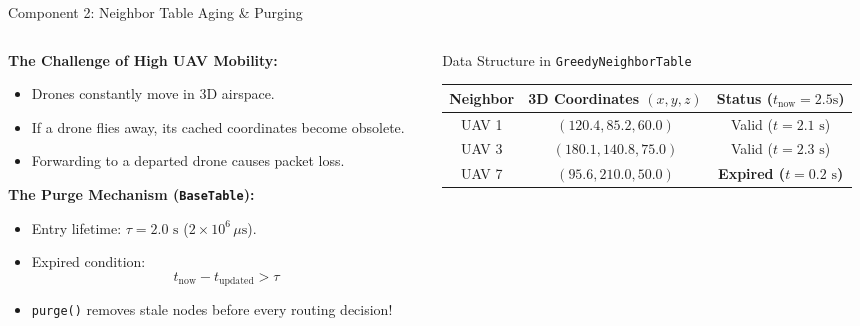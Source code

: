 \documentclass[aspectratio=169,10pt]{beamer}
\begin{document}
\begin{frame}{Component 2: Neighbor Table Aging \& Purging}
  \begin{columns}[T]
    \begin{column}{0.48\textwidth}
      \textbf{The Challenge of High UAV Mobility:}
      \begin{itemize}\setlength{\itemsep}{0.3em}
        \item Drones constantly move in 3D airspace.
        \item If a drone flies away, its cached coordinates become obsolete.
        \item Forwarding to a departed drone causes packet loss.
      \end{itemize}

      \vspace{0.4em}
      \textbf{The Purge Mechanism (\texttt{BaseTable}):}
      \begin{itemize}\setlength{\itemsep}{0.3em}
        \item Entry lifetime: $\tau = 2.0\text{ s}$ ($2\times 10^6\,\mu\text{s}$).
        \item Expired condition:
          \begin{equation*}
            t_{\text{now}} - t_{\text{updated}} > \tau
          \end{equation*}
        \item \texttt{purge()} removes stale nodes before every routing decision!
      \end{itemize}
    \end{column}

    \begin{column}{0.49\textwidth}
      \begin{block}{Data Structure in \texttt{GreedyNeighborTable}}
        \centering
        \scriptsize
        \begin{tabular}{@{}ccc@{}}
          \toprule
          \textbf{Neighbor} & \textbf{3D Coordinates $(x, y, z)$} & \textbf{Status ($t_{\text{now}}=2.5\text{s}$)} \\
          \midrule
          UAV 1 & $(120.4, 85.2, 60.0)$ & Valid ($t=2.1\text{ s}$) \\
          UAV 3 & $(180.1, 140.8, 75.0)$ & Valid ($t=2.3\text{ s}$) \\
          UAV 7 & $(95.6, 210.0, 50.0)$ & \textcolor{voidred}{\textbf{Expired ($t=0.2\text{ s}$)}} \\
          \bottomrule
        \end{tabular}


\end{block}
\end{column}
\end{columns}
\end{frame}
\end{document}
